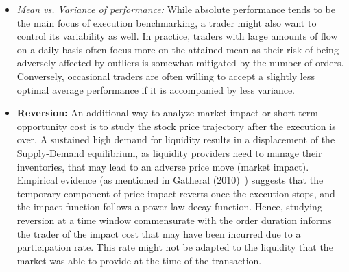 \begin{itemize}
\item \emph{Mean vs. Variance of performance:} While absolute performance tends to be the main focus of execution benchmarking, a trader might also want to control its variability as well. In practice, traders with large amounts of flow on a daily basis often focus more on the attained mean as their risk of being adversely affected by outliers is somewhat mitigated by the number of orders. Conversely, occasional traders are often willing to accept a slightly less optimal average performance if it is accompanied by less variance.

\item \textbf{Reversion:} An additional way to analyze market impact or short term opportunity cost is to study the stock price trajectory after the execution is over. A sustained high demand for liquidity results in a displacement of the Supply-Demand equilibrium, as liquidity providers need to manage their inventories, that may lead to an adverse price move (market impact). Empirical evidence (as mentioned in Gatheral (2010)~\cite{gatheral}) suggests that the temporary component of price impact reverts once the execution stops, and the impact function follows a power law decay function. Hence, studying reversion at a time window commensurate with the order duration informs the trader of the impact cost that may have been incurred due to a participation rate. This rate might not be adapted to the liquidity that the market was able to provide at the time of the transaction.


\end{itemize}
